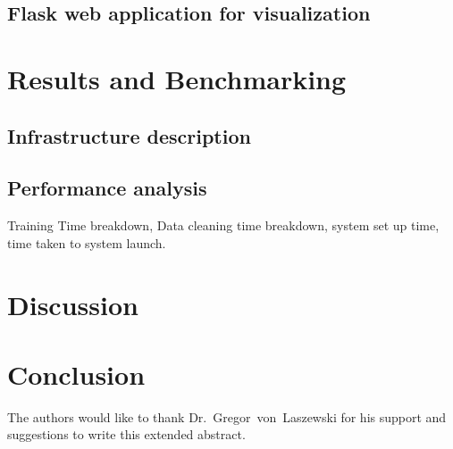 \subsection{Flask web application for visualization}

\section{Results and Benchmarking}

\subsection{Infrastructure description}

\subsection{Performance analysis}
Training Time breakdown, 
Data cleaning time breakdown, 
system set up time, 
time taken to system launch.

\section{Discussion} 

\section{Conclusion} 

\begin{acks}
	
The authors would like to thank Dr.~Gregor~von~Laszewski for his
support and suggestions to write this extended abstract.
	
\end{acks}


 
